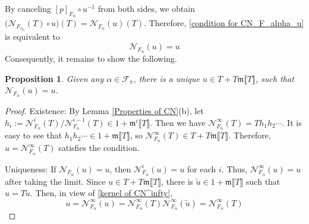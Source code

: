 \documentclass[12pt]{article}
\newtheorem{proposition}[theorem]{Proposition}
\theoremstyle{definition}
\newcommand{\PS}[1]{\llbracket #1 \rrbracket}
\def\CN{\mathscr{N}}
\def\m{\mathfrak{m}}
\begin{document}
    By canceling $[p]_{F_\alpha} \circ u^{-1}$ from both sides, we obtain $\bigl(\CN_{F_{\alpha_u}}(T) \circ u\bigr)(T) = \CN_{F_\alpha}(u)(T)$. Therefore, \eqref{condition for CN_F_alpha_u} is equivalent to 
    \begin{equation*}
        \CN_{F_\alpha}(u) = u
    \end{equation*}
    Consequently, it remains to show the following. 
    \begin{proposition}
        Given any $\alpha \in \mathcal{F}_\pi$, there is a unique $u \in T + T\m\PS{T}$, such that $\CN_{F_\alpha}(u) = u$. 
    \end{proposition}
    \begin{proof} Existence: By Lemma \ref{Properties of CN}(b), let $h_i := \CN_{F_\alpha}^i(T)/\CN_{F_\alpha}^{i-1}(T) \in 1 + \m^i\PS{T}$. Then we have $\CN_{F_\alpha}^\infty(T) = Th_1h_2\cdots$. It is easy to see that $h_1h_2\cdots \in 1 + \m\PS{T}$, so $\CN_{F_\alpha}^\infty(T) \in T + T\m\PS{T}$. Therefore, $u = \CN_{F_\alpha}^\infty(T)$ satisfies the condition. \par 
        Uniqueness: If $\CN_{F_\alpha}(u) = u$, then $\CN_{F_\alpha}^i(u) = u$ for each $i$. Thus, $\CN_{F_\alpha}^\infty (u) = u$ after taking the limit. Since $u \in T + T\m\PS{T}$, there is $\tilde{u} \in 1 + \m\PS{T}$ such that $u = T\tilde{u}$. Then, in view of \eqref{kernel of CN^infty}, 
        \begin{equation*}
            u = \CN_{F_\alpha}^\infty(u) = \CN_{F_\alpha}^\infty(T) \CN_{F_\alpha}^\infty(\tilde{u}) = \CN_{F_\alpha}^\infty(T)
        \end{equation*}
    \end{proof}
\end{document}
